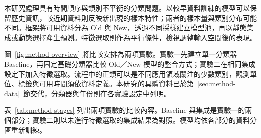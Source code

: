 本研究處理具有時間順序與類別不平衡的分類問題。以較早資料訓練的模型可以保留歷史資訊，較近期資料則反映新出現的樣本特性；兩者的樣本量與類別分布可能不同。框架將可用資料分為 Old 與 New，透過不同採樣建立模型池，再以靜態集成或動態選擇產生預測。特徵選取則作為平行條件，檢視調整輸入空間後的表現。

圖~\ref{fig:method-overview} 將比較安排為兩項實驗。實驗一先建立單一分類器 Baseline，再固定基礎分類器比較 Old／New 模型的整合方式；實驗二在相同集成設定下加入特徵選取。流程中的正類可以是不同應用領域關注的少數類別，觀測單位、標籤與可用時間須依資料定義。本研究的具體資料已於第~\ref{sec:method-data}~節交代，分類器與年份則在各實驗設定中列明。

表~\ref{tab:method-stages} 列出兩項實驗的比較內容。Baseline 與集成是實驗一的兩個部分；實驗二則以未進行特徵選取的集成結果為對照。模型均依各部分的資料分區重新訓練。

